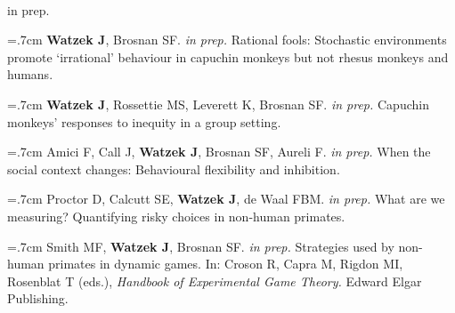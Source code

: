 \documentclass[]{friggeri-cv}
\begin{document}
{\large{} ~\\[-.15cm] in prep.}

\hangindent=.7cm \textbf{Watzek J}, Brosnan SF. \emph{in prep.} Rational fools: Stochastic environments promote `irrational' behaviour in capuchin monkeys but not rhesus monkeys and humans.

\hangindent=.7cm \textbf{Watzek J}, Rossettie MS, Leverett K, Brosnan SF. \emph{in prep.} Capuchin monkeys' responses to inequity in a group setting.

\hangindent=.7cm Amici F, Call J, \textbf{Watzek J}, Brosnan SF, Aureli F. \emph{in prep.} When the social context changes: Behavioural flexibility and inhibition.



\hangindent=.7cm Proctor D, Calcutt SE, \textbf{Watzek J}, de Waal FBM. \emph{in prep.} What are we measuring? Quantifying risky choices in non-human primates.

\hangindent=.7cm Smith MF, \textbf{Watzek J}, Brosnan SF. \emph{in prep.} Strategies used by non-human primates in dynamic games. In: Croson R, Capra M, Rigdon MI, Rosenblat T (eds.), \emph{Handbook of Experimental Game Theory.} Edward Elgar Publishing. \\[-.1cm]


\renewenvironment{aside}{%
  \let\oldsection\section
  \renewcommand{\section}[1]{
    \par\vspace{\baselineskip}{\Large\headingfont\color{headercolor} ##1}
  }
  \begin{textblock}{3.6}(1.5, 1.5)
  \begin{flushright}
  \obeycr
}{%
  \restorecr
  \end{flushright}
  \end{textblock}
  \let\section\oldsection
}
\end{document}
